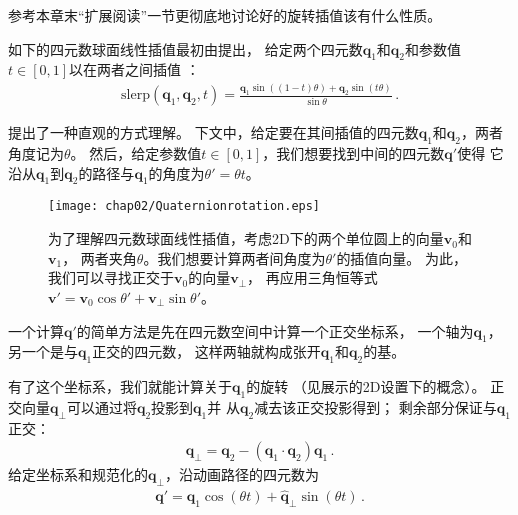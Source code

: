 参考本章末“扩展阅读”一节更彻底地讨论好的旋转插值该有什么性质。

如下的四元数球面线性插值最初由\citet{10.1145/325334.325242}提出，
给定两个四元数$\bm q_1$和$\bm q_2$和参数值$t\in[0,1]$以在两者之间插值
：
\begin{align*}
    \mathrm{slerp}(\bm q_1,\bm q_2,t)=\frac{\bm q_1\sin((1-t)\theta)+\bm q_2\sin(t\theta)}{\sin\theta}\, .
\end{align*}

\citet{Blow_2004}提出了一种直观的方式理解。
下文中，给定要在其间插值的四元数$\bm q_1$和$\bm q_2$，两者角度记为$\theta$。
然后，给定参数值$t\in[0,1]$，我们想要找到中间的四元数$\bm q'$使得
它沿从$\bm q_1$到$\bm q_2$的路径与$\bm q_1$的角度为$\theta'=\theta t$。

\begin{figure}[htbp]
    \centering\texttt{[image: chap02/Quaternionrotation.eps]}
    \caption{为了理解四元数球面线性插值，考虑2D下的两个单位圆上的向量$\bm v_0$和$\bm v_1$，
        两者夹角$\theta$。我们想要计算两者间角度为$\theta'$的插值向量。
        为此，我们可以寻找正交于$\bm v_0$的向量$\bm v_{\perp}$，
        再应用三角恒等式$\bm v'=\bm v_0\cos\theta'+\bm v_{\perp}\sin\theta'$。}
    \label{fig:2.17}
\end{figure}

一个计算$\bm q'$的简单方法是先在四元数空间中计算一个正交坐标系，
一个轴为$\bm q_1$，另一个是与$\bm q_1$正交的四元数，
这样两轴就构成张开$\bm q_1$和$\bm q_2$的基。

有了这个坐标系，我们就能计算关于$\bm q_1$的旋转
（见展示的2D设置下的概念）。
正交向量$\bm q_{\perp}$可以通过将$\bm q_2$投影到$\bm q_1$并
从$\bm q_2$减去该正交投影得到；
剩余部分保证与$\bm q_1$正交：
\begin{align}\label{eq:2.7}
    \bm q_{\perp}=\bm q_2-(\bm q_1\cdot\bm q_2)\bm q_1\, .
\end{align}
给定坐标系和规范化的$\bm q_{\perp}$，沿动画路径的四元数为
\begin{align}\label{eq:2.8}
    \bm q'=\bm q_1\cos(\theta t)+\hat{\bm q}_{\perp}\sin(\theta t)\, .
\end{align}

